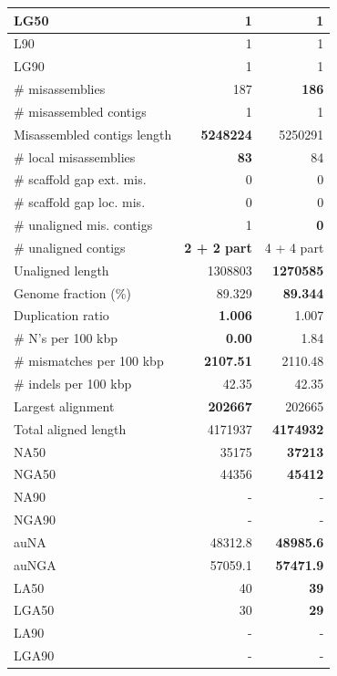 \documentclass[12pt,a4paper]{article}
\begin{document}
\begin{table}[ht]
\begin{center}
\begin{tabular}{|l*{2}{|r}|}
LG50 & 1 & 1 \\ \hline
L90 & 1 & 1 \\ \hline
LG90 & 1 & 1 \\ \hline
\# misassemblies & 187 & {\bf 186} \\ \hline
\# misassembled contigs & 1 & 1 \\ \hline
Misassembled contigs length & {\bf 5248224} & 5250291 \\ \hline
\# local misassemblies & {\bf 83} & 84 \\ \hline
\# scaffold gap ext. mis. & 0 & 0 \\ \hline
\# scaffold gap loc. mis. & 0 & 0 \\ \hline
\# unaligned mis. contigs & 1 & {\bf 0} \\ \hline
\# unaligned contigs & {\bf 2 + 2 part} & 4 + 4 part \\ \hline
Unaligned length & 1308803 & {\bf 1270585} \\ \hline
Genome fraction (\%) & 89.329 & {\bf 89.344} \\ \hline
Duplication ratio & {\bf 1.006} & 1.007 \\ \hline
\# N's per 100 kbp & {\bf 0.00} & 1.84 \\ \hline
\# mismatches per 100 kbp & {\bf 2107.51} & 2110.48 \\ \hline
\# indels per 100 kbp & 42.35 & 42.35 \\ \hline
Largest alignment & {\bf 202667} & 202665 \\ \hline
Total aligned length & 4171937 & {\bf 4174932} \\ \hline
NA50 & 35175 & {\bf 37213} \\ \hline
NGA50 & 44356 & {\bf 45412} \\ \hline
NA90 & - & - \\ \hline
NGA90 & - & - \\ \hline
auNA & 48312.8 & {\bf 48985.6} \\ \hline
auNGA & 57059.1 & {\bf 57471.9} \\ \hline
LA50 & 40 & {\bf 39} \\ \hline
LGA50 & 30 & {\bf 29} \\ \hline
LA90 & - & - \\ \hline
LGA90 & - & - \\ \hline
\end{tabular}
\end{center}
\end{table}
\end{document}
